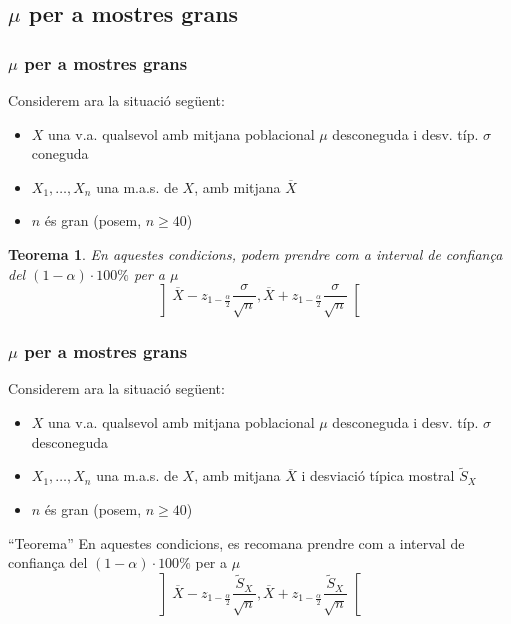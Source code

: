\documentclass[12pt,t]{beamer}
\renewcommand{\emph}[1]{{\color{red}#1}}
\renewcommand{\geq}{\geqslant}
\theoremstyle{plain}
\newtheorem{teorema}{Teorema}
\theoremstyle{definition}
\begin{document}
\subsection{$\mu$ per a mostres grans}

\begin{frame}
\frametitle{$\mu$ per a mostres grans}

Considerem ara la situació següent:
\begin{itemize}
\item  $X$ una v.a.  \emph{qualsevol} amb mitjana poblacional $\mu$ desconeguda i desv. típ. $\sigma$ coneguda

\item $X_1,\ldots,X_n$ una m.a.s. de $X$, amb mitjana $\overline{X}$

\item \emph{$n$ és gran} (posem, $n\geq 40$)
\end{itemize}

\begin{teorema}
En aquestes condicions, podem prendre com a interval  de confiança del $(1-\alpha)\cdot 100\%$ per a $\mu$
$$
\left]\overline{X}-z_{1-\frac{\alpha}{2}}\frac{\sigma}{\sqrt{n}},
    \overline{X}+z_{1-\frac{\alpha}{2}}\frac{\sigma}{\sqrt{n}}\right[
$$
\end{teorema}



\end{frame}


\begin{frame}
\frametitle{$\mu$ per a mostres grans}

Considerem ara la situació següent:
\begin{itemize}
\item  $X$ una v.a.  \emph{qualsevol} amb mitjana poblacional $\mu$ desconeguda  \emph{i desv. típ. $\sigma$ desconeguda}

\item $X_1,\ldots,X_n$ una m.a.s. de $X$, amb mitjana $\overline{X}$ \emph{i desviació típica mostral $\widetilde{S}_X$}

\item \emph{$n$ és gran} (posem, $n\geq 40$)
\end{itemize}


\begin{block}{``Teorema''}
En aquestes condicions, es recomana prendre com a interval  de confiança del $(1-\alpha)\cdot 100\%$ per a $\mu$
$$
\left]\overline{X}-z_{1-\frac{\alpha}{2}}\frac{\widetilde{S}_X}{\sqrt{n}},
    \overline{X}+z_{1-\frac{\alpha}{2}}\frac{\widetilde{S}_X}{\sqrt{n}}\right[
$$
\end{block}



\end{frame}
\end{document}
